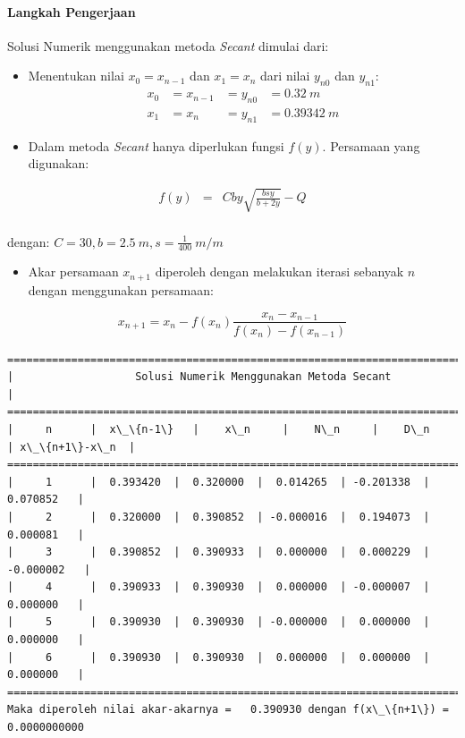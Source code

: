 \documentclass[10pt, a4paper]{article}
\providecommand{\tightlist}{%
      \setlength{\itemsep}{0pt}\setlength{\parskip}{0pt}}
\begin{document}
\paragraph{Langkah Pengerjaan}\label{langkah-pengerjaan}

Solusi Numerik menggunakan metoda \emph{Secant} dimulai dari:

\begin{itemize}
\item
  Menentukan nilai \(x_0 = x_{n-1}\) dan \(x_1 = x_n\) dari nilai
  \(y_{n0}\) dan \(y_{n1}\):
  \[\begin{aligned}x_0 &= x_{n-1} &= y_{n0} &= 0.32\ m \\
  x_1 &= x_{n} &= y_{n1} &= 0.39342\ m\end{aligned}\]
\item
  Dalam metoda \emph{Secant} hanya diperlukan fungsi \(f(y)\). Persamaan
  yang digunakan:
\end{itemize}

\[\begin{aligned} f(y) &=& C b y \sqrt{\frac{b s y}{b + 2 y}} - Q \\
\end{aligned}\]

dengan: \(C = 30, b = 2.5\ m, s = \frac{1}{400}\ m/m\)

\begin{itemize}
\tightlist
\item
  Akar persamaan \(x_{n+1}\) diperoleh dengan melakukan iterasi sebanyak
  \(n\) dengan menggunakan persamaan:
\end{itemize}

\[x_{n+1} = x_n - f(x_n)\frac{x_n - x_{n-1}}{f(x_n) - f(x_{n-1})}\]

    \begin{Verbatim}[commandchars=\\\{\}]
=================================================================================
|                   Solusi Numerik Menggunakan Metoda Secant                    |
=================================================================================
|     n      |  x\_\{n-1\}   |    x\_n     |    N\_n     |    D\_n     | x\_\{n+1\}-x\_n  |
=================================================================================
|     1      |  0.393420  |  0.320000  |  0.014265  | -0.201338  |   0.070852   |
|     2      |  0.320000  |  0.390852  | -0.000016  |  0.194073  |   0.000081   |
|     3      |  0.390852  |  0.390933  |  0.000000  |  0.000229  |  -0.000002   |
|     4      |  0.390933  |  0.390930  |  0.000000  | -0.000007  |   0.000000   |
|     5      |  0.390930  |  0.390930  | -0.000000  |  0.000000  |   0.000000   |
|     6      |  0.390930  |  0.390930  |  0.000000  |  0.000000  |   0.000000   |
=================================================================================
Maka diperoleh nilai akar-akarnya =   0.390930 dengan f(x\_\{n+1\}) =    0.0000000000

    \end{Verbatim}
\end{document}
